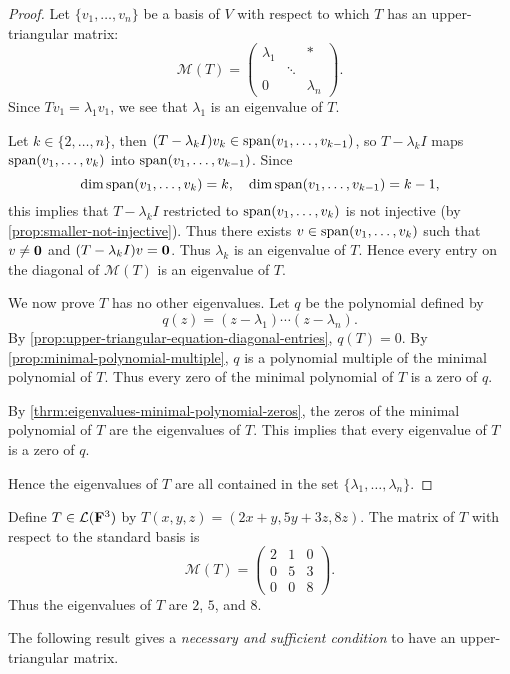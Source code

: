 \begin{proof}
Let $\{v_1,\dots,v_n\}$ be a basis of $V$ with respect to which $T$ has an upper-triangular matrix:
\[\mathcal{M}(T)=\begin{pmatrix}
\lambda_1&&\ast\\
&\ddots&\\
0&&\lambda_n
\end{pmatrix}.\]
Since $Tv_1=\lambda_1v_1$, we see that $\lambda_1$ is an eigenvalue of $T$. 

Let $k\in\{2,\dots,n\}$, then $(T-\lambda_k I)v_k\in\operatorname{span}(v_1,\dots,v_{k-1})$, so $T-\lambda_k I$ maps $\operatorname{span}(v_1,\dots,v_k)$ into $\operatorname{span}(v_1,\dots,v_{k-1})$. Since
\[\dim\operatorname{span}(v_1,\dots,v_k)=k,\quad\dim\operatorname{span}(v_1,\dots,v_{k-1})=k-1,\]
this implies that $T-\lambda_k I$ restricted to $\operatorname{span}(v_1,\dots,v_k)$ is not injective (by \ref{prop:smaller-not-injective}). Thus there exists $v\in\operatorname{span}(v_1,\dots,v_k)$ such that $v\neq\vb{0}$ and $(T-\lambda_k I)v=\vb{0}$. Thus $\lambda_k$ is an eigenvalue of $T$. Hence every entry on the diagonal of $\mathcal{M}(T)$ is an eigenvalue of $T$.

We now prove $T$ has no other eigenvalues. Let $q$ be the polynomial defined by
\[q(z)=(z-\lambda_1)\cdots(z-\lambda_n).\]
By \ref{prop:upper-triangular-equation-diagonal-entries}, $q(T)=0$. By \ref{prop:minimal-polynomial-multiple}, $q$ is a polynomial multiple of the minimal polynomial of $T$. Thus every zero of the minimal polynomial of $T$ is a zero of $q$. 

By \ref{thrm:eigenvalues-minimal-polynomial-zeros}, the zeros of the minimal polynomial of $T$ are the eigenvalues of $T$. This implies that every eigenvalue of $T$ is a zero of $q$. 

Hence the eigenvalues of $T$ are all contained in the set $\{\lambda_1,\dots,\lambda_n\}$.
\end{proof}

\begin{example}
Define $T\in\mathcal{L}(\mathbf F^3)$ by $T(x,y,z)=(2x+y,5y+3z,8z)$. The matrix of $T$ with respect to the standard basis is
\[\mathcal{M}(T)=\begin{pmatrix}
2&1&0\\
0&5&3\\
0&0&8
\end{pmatrix}.\]
Thus the eigenvalues of $T$ are $2$, $5$, and $8$.
\end{example}

The following result gives a \emph{necessary and sufficient condition} to have an upper-triangular matrix.

